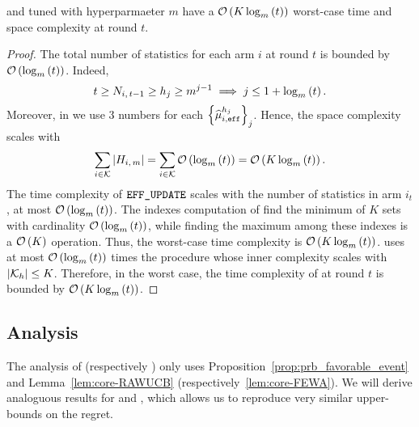 \begin{proposition}
\EFFFEWA and \EFFRAW tuned with hyperparmaeter $m$ have a $\mathcal{O}\left(K\log_m\left(t\right)\right)$ worst-case time and space complexity at round $t$.
\end{proposition}
\begin{proof}
The total number of statistics for each arm $i$ at round $t$ is bounded by $\mathcal{O}\left(\log_m\left(t\right)\right)$. Indeed, 
\[t \geq N_{i,\,t-1} \geq h_j \geq m^{j-1} \implies j \leq 1 + \log_m\left(t\right).\]
Moreover, in \EFF we use 3 numbers for each $\left\{\widehat{\mu}_{i,\texttt{eff}}^{h_j}\right\}_j$. Hence, the space complexity scales with \[ \sum_{i\in \mathcal{K}} | H_{i,\,m}| = \sum_{i\in \mathcal{K}} \mathcal{O}\left(\log_m\left(t\right)\right) = \mathcal{O}\left(K\log_m\left(t\right)\right).\]
The time complexity of $\normalfont {\texttt{EFF\_UPDATE}}$ scales with the number of statistics in arm $i_t$, \ie at most $\mathcal{O}\left(\log_m\left(t\right)\right)$. The indexes computation of \EFFRAW  find the minimum of $K$ sets with cardinality $\mathcal{O}\left(\log_m\left(t\right)\right)$, while finding the maximum among these indexes is a $\mathcal{O}\left(K\right)$ operation.  Thus, the worst-case time complexity is $\mathcal{O}\left(K\log_m\left(t\right)\right)$. \EFFFEWA uses at most $\mathcal{O}\left(\log_m\left(t\right)\right)$ times the procedure \FILTER  whose inner complexity scales with $|\mathcal{K}_h| \leq K$. Therefore, in the worst case, the time complexity of \EFFFEWA at round $t$ is bounded by $\mathcal{O}\left(K\log_m\left(t\right)\right)$.
\end{proof}



\subsection{Analysis}


The analysis of \RUCB (respectively \FEWA) only uses Proposition~\ref{prop:prb_favorable_event} and Lemma~\ref{lem:core-RAWUCB} (respectively~\ref{lem:core-FEWA}). We will derive analoguous results for \EFFRAW and \EFFFEWA, which allows us to reproduce very similar upper-bounds on the regret. 
